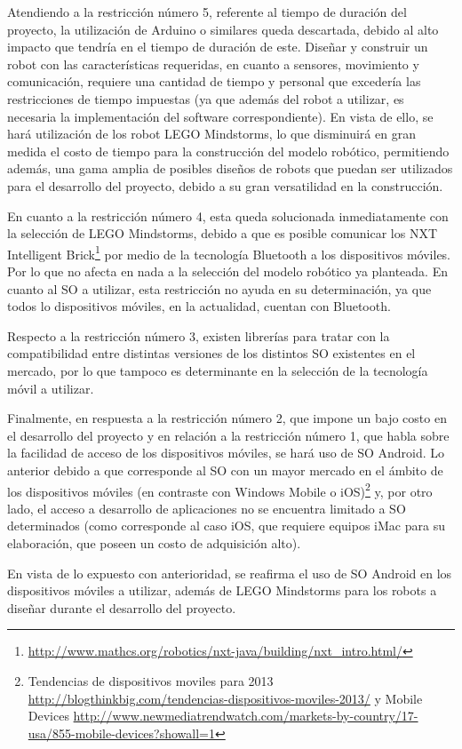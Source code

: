 Atendiendo a la restricci\'on n\'umero 5, referente al tiempo de duraci\'on del proyecto, la utilizaci\'on de Arduino o similares queda descartada, debido al alto impacto que tendr\'ia en el tiempo de duraci\'on de este. Dise\~nar y construir un robot con las caracter\'isticas requeridas, en cuanto a sensores, movimiento y comunicaci\'on, requiere una cantidad de tiempo y personal que exceder\'ia las restricciones de tiempo impuestas (ya que adem\'as del robot a utilizar, es necesaria la implementaci\'on del software correspondiente). En vista de ello, se har\'a utilizaci\'on de los robot LEGO Mindstorms, lo que disminuir\'a en gran medida el costo de tiempo para la construcci\'on del modelo rob\'otico, permitiendo adem\'as, una gama amplia de posibles dise\~nos de robots que puedan ser utilizados para el desarrollo del proyecto, debido a su gran versatilidad en la construcci\'on.

En cuanto a la restricci\'on n\'umero 4, esta queda solucionada inmediatamente con la selecci\'on de LEGO Mindstorms, debido a que es posible comunicar los NXT Intelligent Brick\footnote{\url{http://www.mathcs.org/robotics/nxt-java/building/nxt_intro.html/}} por medio de la tecnolog\'ia Bluetooth a los dispositivos m\'oviles. Por lo que no afecta en nada a la selecci\'on del modelo rob\'otico ya planteada. En cuanto al SO a utilizar, esta restricci\'on no ayuda en su determinaci\'on, ya que todos lo dispositivos m\'oviles, en la actualidad, cuentan con Bluetooth.

Respecto a la restricci\'on n\'umero 3, existen librer\'ias para tratar con la compatibilidad entre distintas versiones de los distintos SO existentes en el mercado, por lo que tampoco es determinante en la selecci\'on de la tecnolog\'ia m\'ovil a utilizar.

Finalmente, en respuesta a la restricci\'on n\'umero 2, que impone un bajo costo en el desarrollo del proyecto y en relaci\'on a la restricci\'on n\'umero 1, que habla sobre la facilidad de acceso de los dispositivos m\'oviles, se har\'a uso de SO Android. Lo anterior debido a que corresponde al SO con un mayor mercado en el \'ambito de los dispositivos m\'oviles (en contraste con Windows Mobile o iOS)\footnote{Tendencias de dispositivos moviles para 2013 \url{http://blogthinkbig.com/tendencias-dispositivos-moviles-2013/} y Mobile Devices \url{http://www.newmediatrendwatch.com/markets-by-country/17-usa/855-mobile-devices?showall=1}} y, por otro lado, el acceso a desarrollo de aplicaciones no se encuentra limitado a SO determinados (como corresponde al caso iOS, que requiere equipos iMac para su elaboraci\'on, que poseen un costo de adquisici\'on alto).

En vista de lo expuesto con anterioridad, se reafirma el uso de SO Android en los dispositivos m\'oviles a utilizar, adem\'as de LEGO Mindstorms para los robots a dise\~nar durante el desarrollo del proyecto.
